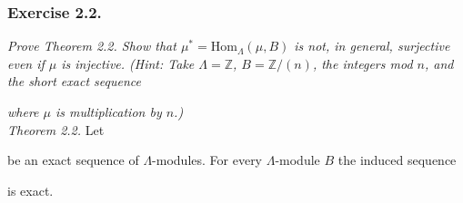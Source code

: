 \documentclass{article}
\begin{document}
\subsubsection*{Exercise 2.2.}
\emph{Prove Theorem 2.2.
Show that $\mu^{*} = \mathrm{Hom}_{\Lambda}(\mu,B)$ is not, in general,
surjective even if $\mu$ is injective.
(Hint: Take $\Lambda = \mathbb{Z}$, $B = \mathbb{Z}/(n)$, the integers mod $n$,
and the short exact sequence}
\emph{where $\mu$ is multiplication by $n$.)} \\



\emph{Theorem 2.2.}
Let
be an exact sequence of $\Lambda$-modules.
For every $\Lambda$-module $B$ the induced sequence
\begin{center}
\end{center}
is exact. \\
\end{document}
